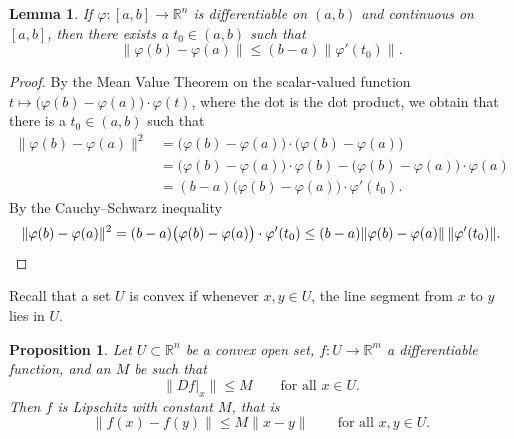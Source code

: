 \documentclass[12pt,openany]{book}
\newcommand{\snorm}[1]{\lVert {#1} \rVert}
\newcommand{\R}{{\mathbb{R}}}
\theoremstyle{plain}
\newtheorem{lemma}[thm]{Lemma}
\newtheorem{prop}[thm]{Proposition}
\theoremstyle{remark}
\theoremstyle{definition}
\theoremstyle{exercise}
\theoremstyle{example}
\begin{document}
\begin{lemma}
If $\varphi \colon [a,b] \to \R^n$ is differentiable on $(a,b)$ and
continuous on $[a,b]$, then there exists a $t_0 \in (a,b)$ such that
\begin{equation*}
\snorm{\varphi(b)-\varphi(a)} \leq (b-a) \snorm{\varphi'(t_0)} .
\end{equation*}
\end{lemma}

\begin{proof}
By the Mean Value Theorem on the scalar-valued function
$t \mapsto \bigl(\varphi(b)-\varphi(a) \bigr) \cdot \varphi(t)$,
where the dot is the dot product, we obtain
that
there is a $t_0 \in (a,b)$ such that
\begin{equation*}
\begin{split}
\snorm{\varphi(b)-\varphi(a)}^2
& =
\bigl( \varphi(b)-\varphi(a) \bigr)
\cdot
\bigl( \varphi(b)-\varphi(a) \bigr)
\\
& =
\bigl(\varphi(b)-\varphi(a) \bigr) \cdot \varphi(b) - 
\bigl(\varphi(b)-\varphi(a) \bigr) \cdot \varphi(a)
\\
& = 
(b-a)
\bigl(\varphi(b)-\varphi(a) \bigr) \cdot \varphi'(t_0) .
\end{split}
\end{equation*}
By the Cauchy--Schwarz inequality
\begin{equation*}
\snorm{\varphi(b)-\varphi(a)}^2
=
(b-a)\bigl(\varphi(b)-\varphi(a) \bigr) \cdot \varphi'(t_0)
\leq
(b-a)
\snorm{\varphi(b)-\varphi(a)} \, \snorm{\varphi'(t_0)} . \qedhere
\end{equation*}
\end{proof}

Recall that a set $U$ is convex
if whenever $x,y \in U$, the line segment from
$x$ to $y$ lies in $U$.

\begin{prop} \label{mv:prop:convexlip}
Let $U \subset \R^n$ be a convex open set, $f \colon U \to \R^m$
a differentiable function, and an $M$ be such that
\begin{equation*}
\snorm{Df|_x} \leq M
\qquad \text{for all } x \in U.
\end{equation*}
Then $f$ is Lipschitz with constant $M$, that is
\begin{equation*}
\snorm{f(x)-f(y)} \leq M \snorm{x-y}
\qquad
\text{for all } x,y \in U.
\end{equation*}
\end{prop}
\end{document}
